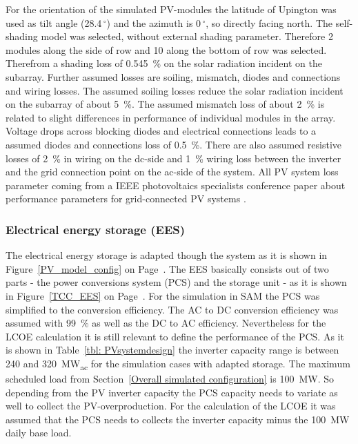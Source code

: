 For the orientation of the simulated PV-modules the latitude of Upington was used as tilt angle (28.4$\,^{\circ}$) and the azimuth is 0$\,^{\circ}$, so directly facing north. The self-shading model was selected, without external shading parameter. Therefore 2 modules along the side of row and 10 along the bottom of row was selected. Therefrom a shading loss of 0.545~\% on the solar radiation incident on the subarray. Further assumed losses are soiling, mismatch, diodes and connections and wiring losses. The assumed soiling losses reduce the solar radiation incident on the subarray of about 5~\%. The assumed mismatch loss of about 2~\% is related to slight differences in performance of individual modules in the array. Voltage drops across blocking diodes and electrical connections leads to a assumed diodes and connections loss of 0.5~\%. There are also assumed resistive losses of 2~\% in wiring on the dc-side and 1~\% wiring loss between the inverter and the grid connection point on the ac-side of the system. All PV system loss parameter coming from a IEEE photovoltaics specialists conference paper about performance parameters for grid-connected PV systems \cite{Marion2005}.
\subsubsection{Electrical energy storage (EES)}
The electrical energy storage is adapted though the system as it is shown in Figure~\ref{PV_model_config} on Page~\pageref{PV_model_config}. The EES basically consists out of two parts - the power conversions system (PCS) and the storage unit - as it is shown in Figure~\ref{TCC_EES} on Page~\pageref{TCC_EES}. For the simulation in SAM the PCS was simplified to the conversion efficiency. The AC to DC conversion efficiency was assumed with 99~\% as well as the DC to AC efficiency. Nevertheless for the LCOE calculation it is still relevant to define the performance of the PCS. As it is shown in Table~\ref{tbl: PVsystemdesign} the inverter capacity range is between 240 and \SI{320}{MW}\textsubscript{ac} for the simulation cases with adapted storage. The maximum scheduled load from Section~\ref{Overall simulated configuration} is \SI{100}{MW}. So depending from the PV inverter capacity the PCS capacity needs to variate as well to collect the  PV-overproduction. For the calculation of the LCOE it was assumed that the PCS needs to collects the inverter capacity minus the \SI{100}{MW} daily base load.



